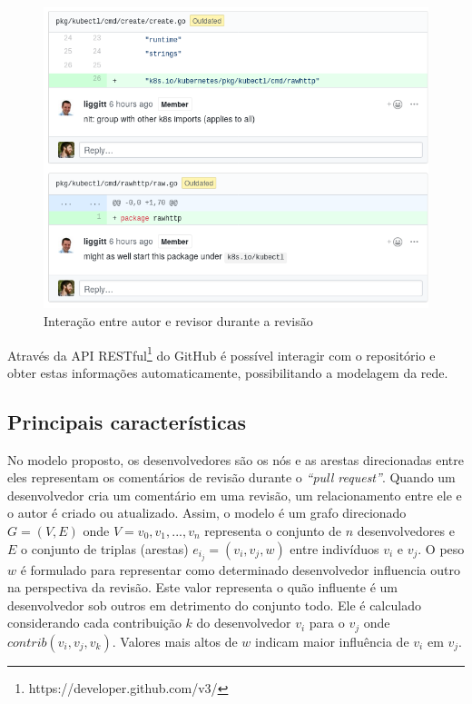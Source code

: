 \documentclass[12pt,openany,oneside,a4paper,english,brazil]{abntbibufjf}
\begin{document}
\begin{figure}[htbp]
 \includegraphics[width=\textwidth]{comment-codereview}
 \caption{Interação entre autor e revisor durante a revisão}\label{fig:comment-codereview}
\end{figure}

Através da API RESTful\footnote{https://developer.github.com/v3/} do GitHub é possível interagir com o repositório e obter estas informações automaticamente, possibilitando a modelagem da rede.

\subsection{Principais características}
No modelo proposto, os desenvolvedores são os nós e as arestas direcionadas entre eles representam os comentários de revisão durante o \textit{``pull request''}. Quando um desenvolvedor cria um comentário em uma revisão, um relacionamento entre ele e o autor é criado ou atualizado. Assim, o modelo é um grafo direcionado $ G = (V, E) $ onde $ V ={v_0, v_1, ... , v_n} $ representa o conjunto de $n$ desenvolvedores e $E$ o conjunto de triplas (arestas) $e_i_j = (v_i, v_j, w)$ entre indivíduos $v_i$ e $v_j$. O peso $w$ é formulado para representar como determinado desenvolvedor influencia outro na perspectiva da revisão. Este valor representa o quão influente é um desenvolvedor sob outros em detrimento do conjunto todo. Ele é calculado considerando cada contribuição $k$ do desenvolvedor $v_i$ para o $v_j$ onde $contrib(v_i,v_j,v_k)$. Valores mais altos de $w$ indicam maior influência de $v_i$ em $v_j$.
\end{document}
